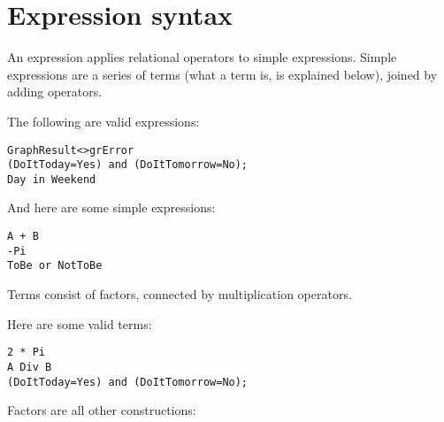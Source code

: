 \section{Expression syntax}
An expression applies relational operators to simple expressions. Simple
expressions are a series of terms (what a term is, is explained below), joined by
adding operators.

The following are valid expressions:
\begin{verbatim}
GraphResult<>grError
(DoItToday=Yes) and (DoItTomorrow=No);
Day in Weekend
\end{verbatim}
And here are some simple expressions:
\begin{verbatim}
A + B
-Pi
ToBe or NotToBe
\end{verbatim}
Terms consist of factors, connected by multiplication operators.

Here are some valid terms:
\begin{verbatim}
2 * Pi
A Div B
(DoItToday=Yes) and (DoItTomorrow=No);
\end{verbatim}
Factors are all other constructions:


